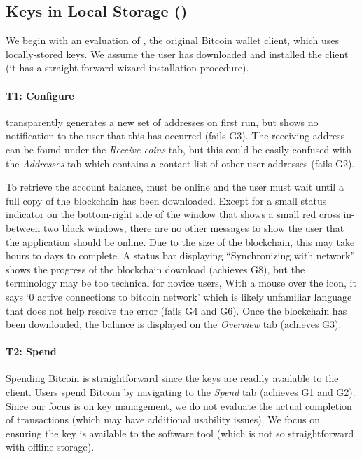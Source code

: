\subsection{Keys in Local Storage (\bitcoinclient)}
We begin with an evaluation of \bitcoinclient, the original Bitcoin wallet client, which uses locally-stored keys. We assume the user has downloaded and installed the \bitcoinclient client (it has a straight forward wizard installation procedure).

\paragraph{T1: Configure} \bitcoinclient transparently generates a new set of addresses on first run, but shows no notification to the user that this has occurred (fails G3). The receiving address can be found under the \emph{Receive coins} tab, but this could be easily confused with the \emph{Addresses} tab which contains a contact list of other user addresses (fails G2). 

To retrieve the account balance, \bitcoinclient must be online and the user must wait until a full copy of the blockchain has been downloaded.  Except for a small status indicator on the bottom-right side of the window that shows a small red cross in-between two black windows, there are no other messages to show the user that the application should be online. Due to the size of the blockchain, this may take hours to days to complete. A status bar displaying ``Synchronizing with network'' shows the progress of the blockchain download (achieves G8), but the terminology may be too technical for novice users, With a mouse over the icon, it says `0 active connections to bitcoin network' which is likely unfamiliar language that does not help resolve the error (fails G4 and G6). Once the blockchain has been downloaded, the balance is displayed on the \emph{Overview} tab (achieves G3). 

\paragraph{T2: Spend} Spending Bitcoin is straightforward since the keys are readily available to the \bitcoinclient client. Users spend Bitcoin by navigating to the \emph{Spend} tab (achieves G1 and G2). Since our focus is on key management, we do not evaluate the actual completion of transactions (which may have additional usability issues). We focus on ensuring the key is available to the software tool (which is not so straightforward with \eg offline storage). 

